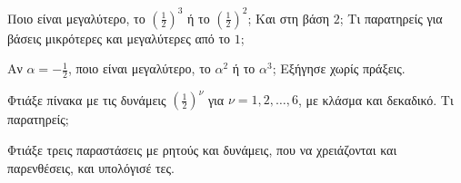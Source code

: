 \ex Ποιο είναι μεγαλύτερο, το $\left(\frac{1}{2}\right)^3$ ή το $\left(\frac{1}{2}\right)^2$; Και στη βάση $2$; Τι παρατηρείς για βάσεις μικρότερες και μεγαλύτερες από το $1$;

\ex Αν $\alpha=-\frac{1}{2}$, ποιο είναι μεγαλύτερο, το $\alpha^2$ ή το $\alpha^3$; Εξήγησε χωρίς πράξεις.


\ex Φτιάξε πίνακα με τις δυνάμεις $\left(\frac{1}{2}\right)^{\nu}$ για $\nu=1,2,\dots,6$, με κλάσμα και δεκαδικό. Τι παρατηρείς;

\ex Φτιάξε τρεις παραστάσεις με ρητούς και δυνάμεις, που να χρειάζονται και παρενθέσεις, και υπολόγισέ τες.
